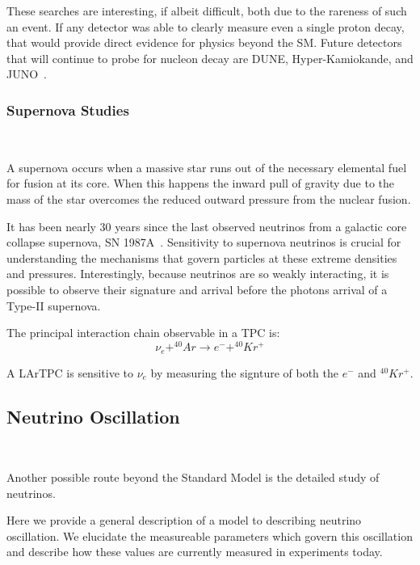 These searches are interesting, if albeit difficult, both due to the rareness of such an event.
If any detector was able to clearly measure even a single proton decay, that would provide direct evidence for physics beyond the SM.
Future detectors that will continue to probe for nucleon decay are DUNE, Hyper-Kamiokande, and JUNO~\citep{DUNE_TDR_V1_Abi_2020, https://doi.org/10.48550/arxiv.1805.04163, Juno:2022103927}.

\subsubsection{Supernova Studies}~\label{sec:intro_supernova}

A supernova occurs when a massive star runs out of the necessary elemental fuel for fusion at its core.
When this happens the inward pull of gravity due to the mass of the star overcomes the reduced outward pressure from the nuclear fusion.

It has been nearly 30 years since the last observed neutrinos from a galactic core collapse supernova, SN 1987A~\citep{1987ApJ...322..795F}.
Sensitivity to supernova neutrinos is crucial for understanding the mechanisms that govern particles at these extreme densities and pressures.
Interestingly, because neutrinos are so weakly interacting, it is possible to observe their signature and arrival before the photons arrival of a Type-II supernova.

The principal interaction chain observable in a TPC is:
\begin{equation}
    \nu_{e} + ^{40}Ar \rightarrow e^- + ^{40}Kr^{+}
\end{equation}

A LArTPC is sensitive to $\nu_{e}$ by measuring the signture of both the $e^{-}$ and $^{40}Kr^{+}$.

\subsection{Neutrino Oscillation}~\label{sec:neutrino_osc}

Another possible route beyond the Standard Model is the detailed study of neutrinos.

Here we provide a general description of a model to describing neutrino oscillation.
We elucidate the measureable parameters which govern this oscillation and describe how these values are currently measured in experiments today.

